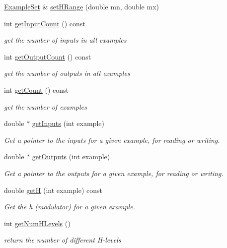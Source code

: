 \begin{DoxyCompactItemize}
\hyperlink{classExampleSet}{Example\+Set} \& \hyperlink{classExampleSet_a32f409e6dae79b926041814e704791de}{set\+H\+Range} (double mn, double mx)
\item 
int \hyperlink{classExampleSet_adc2a5ca623db66524e19562ba677cd67}{get\+Input\+Count} () const 
\begin{DoxyCompactList}\small\item\em get the number of inputs in all examples \end{DoxyCompactList}\item 
int \hyperlink{classExampleSet_a700faa92ffb424ffa8b0f58ab597e240}{get\+Output\+Count} () const 
\begin{DoxyCompactList}\small\item\em get the number of outputs in all examples \end{DoxyCompactList}\item 
int \hyperlink{classExampleSet_a58cdb9c925a4f33267541197d897fdd8}{get\+Count} () const 
\begin{DoxyCompactList}\small\item\em get the number of examples \end{DoxyCompactList}\item 
double $\ast$ \hyperlink{classExampleSet_a77229f0f933a885f5bffc6e46cafe432}{get\+Inputs} (int example)
\begin{DoxyCompactList}\small\item\em Get a pointer to the inputs for a given example, for reading or writing. \end{DoxyCompactList}\item 
double $\ast$ \hyperlink{classExampleSet_a97c5c5596d388c2adcb1f761472d18aa}{get\+Outputs} (int example)
\begin{DoxyCompactList}\small\item\em Get a pointer to the outputs for a given example, for reading or writing. \end{DoxyCompactList}\item 
double \hyperlink{classExampleSet_a084224adb0fdf5555caa24a0bd4d4211}{getH} (int example) const 
\begin{DoxyCompactList}\small\item\em Get the h (modulator) for a given example. \end{DoxyCompactList}\item 
int \hyperlink{classExampleSet_a3558d3a74a8bccf8736f2a2e65a861f2}{get\+Num\+H\+Levels} ()
\begin{DoxyCompactList}\small\item\em return the number of different H-\/levels \end{DoxyCompactList}\item 

\end{DoxyCompactItemize}
